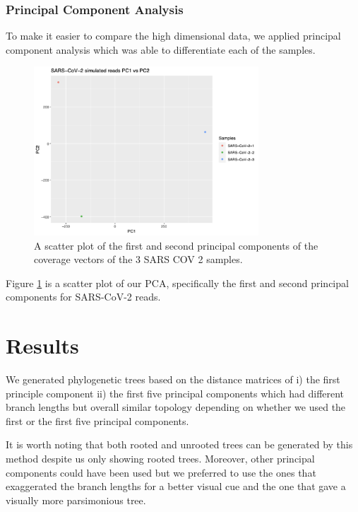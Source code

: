\documentclass[10pt, a4paper]{article}
\begin{document}
\newpage
\subsubsection{Principal Component Analysis}
\label{sec:orgec9fdb4}
To make it easier to compare the high dimensional data, we applied principal 
component analysis which was able to differentiate each of the samples.

\begin{figure}[h]
\centering
\includegraphics[width=0.75\textwidth]{../Figures/SARS_CoV_2/PCA.png}
\caption[SARS-CoV-2 PCA]{\label{fig:orgf65a258}
A scatter plot of the first and second principal components of the coverage vectors of the 3 SARS COV 2 samples.}
\end{figure}

Figure \ref{fig:orgf65a258} is a scatter plot of our PCA, specifically the first and second
principal components for SARS-CoV-2 reads.

\clearpage
\section{Results}
\label{sec:org84f6f01}
We generated phylogenetic trees based on the distance matrices of i) the first 
principle component ii) the first five principal components which had different 
branch lengths but overall similar topology depending on whether we used the 
first or the first five principal components. 

It is worth noting that both rooted and unrooted trees can be generated by this
method despite us only showing rooted trees. Moreover, other principal
components could have been used but we preferred to use the ones that
exaggerated the branch lengths for a better visual cue and the one that gave a 
visually more parsimonious tree.
\end{document}
